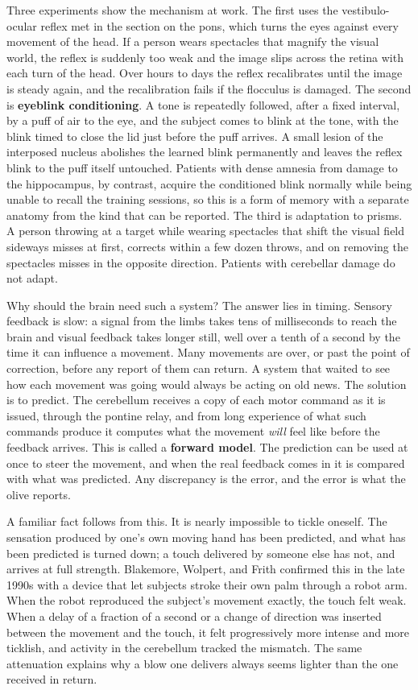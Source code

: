 \documentclass[11pt]{article}
\begin{document}
Three experiments show the mechanism at work. The first uses the vestibulo-ocular reflex met in the section on the pons, which turns the eyes against every movement of the head. If a person wears spectacles that magnify the visual world, the reflex is suddenly too weak and the image slips across the retina with each turn of the head. Over hours to days the reflex recalibrates until the image is steady again, and the recalibration fails if the flocculus is damaged. The second is \textbf{eyeblink conditioning}. A tone is repeatedly followed, after a fixed interval, by a puff of air to the eye, and the subject comes to blink at the tone, with the blink timed to close the lid just before the puff arrives. A small lesion of the interposed nucleus abolishes the learned blink permanently and leaves the reflex blink to the puff itself untouched. Patients with dense amnesia from damage to the hippocampus, by contrast, acquire the conditioned blink normally while being unable to recall the training sessions, so this is a form of memory with a separate anatomy from the kind that can be reported. The third is adaptation to prisms. A person throwing at a target while wearing spectacles that shift the visual field sideways misses at first, corrects within a few dozen throws, and on removing the spectacles misses in the opposite direction. Patients with cerebellar damage do not adapt.

Why should the brain need such a system? The answer lies in timing. Sensory feedback is slow: a signal from the limbs takes tens of milliseconds to reach the brain and visual feedback takes longer still, well over a tenth of a second by the time it can influence a movement. Many movements are over, or past the point of correction, before any report of them can return. A system that waited to see how each movement was going would always be acting on old news. The solution is to predict. The cerebellum receives a copy of each motor command as it is issued, through the pontine relay, and from long experience of what such commands produce it computes what the movement \textit{will} feel like before the feedback arrives. This is called a \textbf{forward model}. The prediction can be used at once to steer the movement, and when the real feedback comes in it is compared with what was predicted. Any discrepancy is the error, and the error is what the olive reports.

A familiar fact follows from this. It is nearly impossible to tickle oneself. The sensation produced by one's own moving hand has been predicted, and what has been predicted is turned down; a touch delivered by someone else has not, and arrives at full strength. Blakemore, Wolpert, and Frith confirmed this in the late 1990s with a device that let subjects stroke their own palm through a robot arm. When the robot reproduced the subject's movement exactly, the touch felt weak. When a delay of a fraction of a second or a change of direction was inserted between the movement and the touch, it felt progressively more intense and more ticklish, and activity in the cerebellum tracked the mismatch. The same attenuation explains why a blow one delivers always seems lighter than the one received in return.
\end{document}
